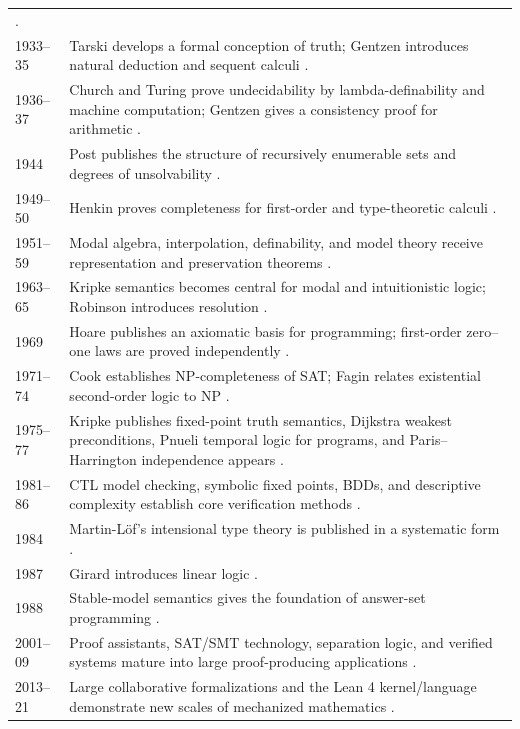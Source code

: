 \begin{longtable}{@{}p{}p{}@{}}
\cite{Godel1931}. \\
1933--35 & Tarski develops a formal conception of truth; Gentzen introduces
natural deduction and sequent calculi \cite{Tarski1983,Gentzen1934a,
Gentzen1935b}. \\
1936--37 & Church and Turing prove undecidability by lambda-definability and
machine computation; Gentzen gives a consistency proof for arithmetic
\cite{Church1936,Turing1937,Gentzen1936}. \\
1944 & Post publishes the structure of recursively enumerable sets and degrees
of unsolvability \cite{Post1944}. \\
1949--50 & Henkin proves completeness for first-order and type-theoretic
calculi \cite{Henkin1949,Henkin1950}. \\
1951--59 & Modal algebra, interpolation, definability, and model theory receive
representation and preservation theorems \cite{JonssonTarski1951,Craig1957,
Beth1953,Tennenbaum1959}. \\
1963--65 & Kripke semantics becomes central for modal and intuitionistic logic;
Robinson introduces resolution \cite{Kripke1963,Kripke1965,Robinson1965}. \\
1969 & Hoare publishes an axiomatic basis for programming; first-order
zero--one laws are proved independently \cite{Hoare1969,GlebskiiEtAl1969}. \\
1971--74 & Cook establishes NP-completeness of SAT; Fagin relates existential
second-order logic to NP \cite{Cook1971,Fagin1974}. \\
1975--77 & Kripke publishes fixed-point truth semantics, Dijkstra weakest
preconditions, Pnueli temporal logic for programs, and Paris--Harrington
independence appears \cite{Kripke1975,Dijkstra1975,Pnueli1977,
ParisHarrington1977}. \\
1981--86 & CTL model checking, symbolic fixed points, BDDs, and descriptive
complexity establish core verification methods \cite{ClarkeEmerson1981,
Vardi1982,Bryant1986,Immerman1986}. \\
1984 & Martin-L\"of's intensional type theory is published in a systematic
form \cite{MartinLof1984}. \\
1987 & Girard introduces linear logic \cite{Girard1987}. \\
1988 & Stable-model semantics gives the foundation of answer-set programming
\cite{GelfondLifschitz1988}. \\
2001--09 & Proof assistants, SAT/SMT technology, separation logic, and verified
systems mature into large proof-producing applications
\cite{ReynoldsSeparation2002,DeMouraBjorner2008,Leroy2009,KleinEtAl2009}. \\
2013--21 & Large collaborative formalizations and the Lean 4 kernel/language
demonstrate new scales of mechanized mathematics
\cite{GonthierEtAl2013,DeMouraUllrich2021}. \\
\bottomrule
\end{longtable}

